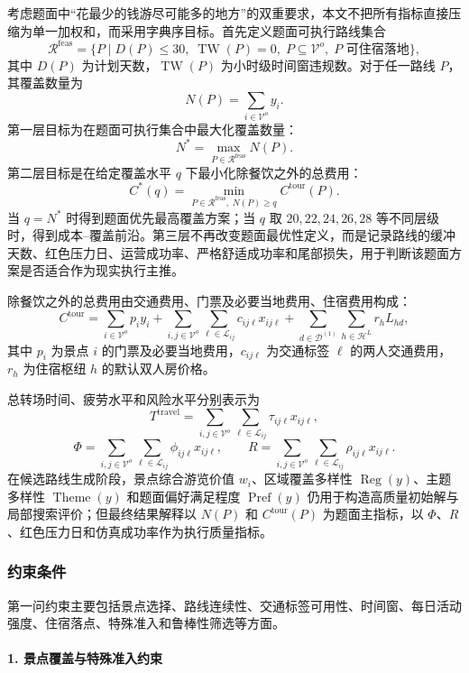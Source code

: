 \documentclass[UTF8,zihao=-4,a4paper]{ctexart}
\begin{document}
考虑题面中“花最少的钱游尽可能多的地方”的双重要求，本文不把所有指标直接压缩为单一加权和，而采用字典序目标。首先定义题面可执行路线集合
\[
\mathcal{R}^{\mathrm{feas}}
=
\{P\mid D(P)\leq 30,\;
\operatorname{TW}(P)=0,\;
P\subseteq\mathcal{V}^{o},\;
P\text{ 可住宿落地}\},
\]
其中 $D(P)$ 为计划天数，$\operatorname{TW}(P)$ 为小时级时间窗违规数。对于任一路线 $P$，其覆盖数量为
\[
N(P)=\sum_{i\in\mathcal{V}^{o}}y_i .
\]
第一层目标为在题面可执行集合中最大化覆盖数量：
\[
N^{*}
=
\max_{P\in\mathcal{R}^{\mathrm{feas}}} N(P).
\]
第二层目标是在给定覆盖水平 $q$ 下最小化除餐饮之外的总费用：
\[
C^{*}(q)
=
\min_{P\in\mathcal{R}^{\mathrm{feas}},\;N(P)\geq q}
C^{\mathrm{tour}}(P).
\]
当 $q=N^{*}$ 时得到题面优先最高覆盖方案；当 $q$ 取 $20,22,24,26,28$ 等不同层级时，得到成本--覆盖前沿。第三层不再改变题面最优性定义，而是记录路线的缓冲天数、红色压力日、运营成功率、严格舒适成功率和尾部损失，用于判断该题面方案是否适合作为现实执行主推。

除餐饮之外的总费用由交通费用、门票及必要当地费用、住宿费用构成：
\[
C^{\mathrm{tour}}
=
\sum_{i\in\mathcal{V}^{o}} p_i y_i
+
\sum_{i,j\in\mathcal{V}^{o}}\sum_{\ell\in\mathcal{L}_{ij}} c_{ij\ell}x_{ij\ell}
+
\sum_{d\in\mathcal{D}^{(1)}}\sum_{h\in\mathcal{H}^{L}} r_h L_{hd},
\]
其中 $p_i$ 为景点 $i$ 的门票及必要当地费用，$c_{ij\ell}$ 为交通标签 $\ell$ 的两人交通费用，$r_h$ 为住宿枢纽 $h$ 的默认双人房价格。

总转场时间、疲劳水平和风险水平分别表示为
\[
T^{\mathrm{travel}}
=
\sum_{i,j\in\mathcal{V}^{o}}\sum_{\ell\in\mathcal{L}_{ij}}
\tau_{ij\ell}x_{ij\ell},
\]
\[
\Phi
=
\sum_{i,j\in\mathcal{V}^{o}}\sum_{\ell\in\mathcal{L}_{ij}}
\phi_{ij\ell}x_{ij\ell},
\qquad
R
=
\sum_{i,j\in\mathcal{V}^{o}}\sum_{\ell\in\mathcal{L}_{ij}}
\rho_{ij\ell}x_{ij\ell}.
\]
在候选路线生成阶段，景点综合游览价值 $w_i$、区域覆盖多样性 $\operatorname{Reg}(y)$、主题多样性 $\operatorname{Theme}(y)$ 和题面偏好满足程度 $\operatorname{Pref}(y)$ 仍用于构造高质量初始解与局部搜索评价；但最终结果解释以 $N(P)$ 和 $C^{\mathrm{tour}}(P)$ 为题面主指标，以 $\Phi$、$R$、红色压力日和仿真成功率作为执行质量指标。

\subsubsection{约束条件}
\label{subsubsec:q1_constraints}

第一问约束主要包括景点选择、路线连续性、交通标签可用性、时间窗、每日活动强度、住宿落点、特殊准入和鲁棒性筛选等方面。

\paragraph{1. 景点覆盖与特殊准入约束}
\end{document}
